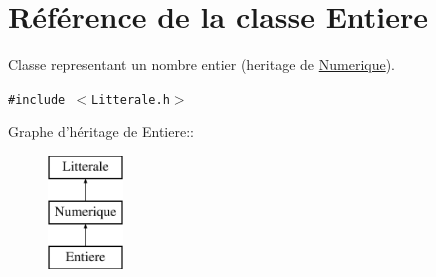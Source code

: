 \hypertarget{class_entiere}{
\section{Référence de la classe Entiere}
\label{class_entiere}
}
Classe representant un nombre entier (heritage de \hyperlink{class_numerique}{Numerique}).  


{\tt \#include $<$Litterale.h$>$}

Graphe d'héritage de Entiere::\begin{figure}[H]
\begin{center}
\leavevmode
\includegraphics[height=3cm]{class_entiere}
\end{center}
\end{figure}
